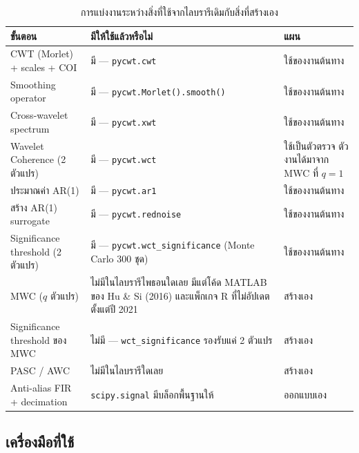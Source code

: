 \documentclass[a4paper,12pt]{article}
\begin{document}
\begin{table}[htbp]
\centering
\caption{การแบ่งงานระหว่างสิ่งที่ใช้จากไลบรารีเดิมกับสิ่งที่สร้างเอง}
\footnotesize
\begin{tabular}{@{}L{4.7cm}L{6.1cm}L{3.5cm}@{}}
\toprule
\textbf{ขั้นตอน} & \textbf{มีให้ใช้แล้วหรือไม่} & \textbf{แผน} \\
\midrule
CWT (Morlet) + scales + COI          & มี --- \texttt{pycwt.cwt}             & ใช้ของงานต้นทาง \\
Smoothing operator                    & มี --- \texttt{pycwt.Morlet().smooth()} & ใช้ของงานต้นทาง \\
Cross-wavelet spectrum                & มี --- \texttt{pycwt.xwt}             & ใช้ของงานต้นทาง \\
Wavelet Coherence (2 ตัวแปร)          & มี --- \texttt{pycwt.wct}             & ใช้เป็นตัวตรวจ ตัวงานได้มาจาก MWC ที่ $q=1$ \\
ประมาณค่า AR(1)                       & มี --- \texttt{pycwt.ar1}             & ใช้ของงานต้นทาง \\
สร้าง AR(1) surrogate                 & มี --- \texttt{pycwt.rednoise}        & ใช้ของงานต้นทาง \\
Significance threshold (2 ตัวแปร)     & มี --- \texttt{pycwt.wct\_significance} (Monte Carlo 300 ชุด) & ใช้ของงานต้นทาง \\
\addlinespace[2pt]
MWC ($q$ ตัวแปร)                      & ไม่มีในไลบรารีไพธอนใดเลย มีแต่โค้ด MATLAB ของ Hu \& Si (2016)
                                        และแพ็กเกจ R ที่ไม่อัปเดตตั้งแต่ปี 2021 & สร้างเอง \\
Significance threshold ของ MWC        & ไม่มี --- \texttt{wct\_significance} รองรับแค่ 2 ตัวแปร & สร้างเอง \\
PASC / AWC                            & ไม่มีในไลบรารีใดเลย                   & สร้างเอง \\
Anti-alias FIR + decimation           & \texttt{scipy.signal} มีบล็อกพื้นฐานให้ & ออกแบบเอง \\
\bottomrule
\end{tabular}
\end{table}

\subsection{เครื่องมือที่ใช้}
\end{document}
